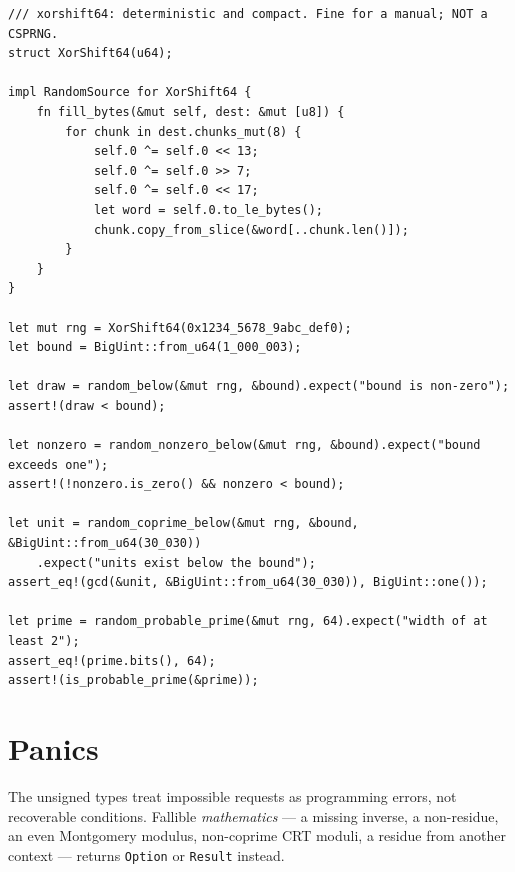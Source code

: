 \documentclass[11pt]{article}
\newcommand{\code}[1]{\texttt{#1}}
\begin{document}
\begin{lstlisting}
/// xorshift64: deterministic and compact. Fine for a manual; NOT a CSPRNG.
struct XorShift64(u64);

impl RandomSource for XorShift64 {
    fn fill_bytes(&mut self, dest: &mut [u8]) {
        for chunk in dest.chunks_mut(8) {
            self.0 ^= self.0 << 13;
            self.0 ^= self.0 >> 7;
            self.0 ^= self.0 << 17;
            let word = self.0.to_le_bytes();
            chunk.copy_from_slice(&word[..chunk.len()]);
        }
    }
}

let mut rng = XorShift64(0x1234_5678_9abc_def0);
let bound = BigUint::from_u64(1_000_003);

let draw = random_below(&mut rng, &bound).expect("bound is non-zero");
assert!(draw < bound);

let nonzero = random_nonzero_below(&mut rng, &bound).expect("bound exceeds one");
assert!(!nonzero.is_zero() && nonzero < bound);

let unit = random_coprime_below(&mut rng, &bound, &BigUint::from_u64(30_030))
    .expect("units exist below the bound");
assert_eq!(gcd(&unit, &BigUint::from_u64(30_030)), BigUint::one());

let prime = random_probable_prime(&mut rng, 64).expect("width of at least 2");
assert_eq!(prime.bits(), 64);
assert!(is_probable_prime(&prime));
\end{lstlisting}

\section{Panics}

The unsigned types treat impossible requests as programming errors, not
recoverable conditions. Fallible \emph{mathematics} --- a missing inverse,
a non-residue, an even Montgomery modulus, non-coprime CRT moduli, a
residue from another context --- returns \code{Option} or \code{Result}
instead.
\end{document}
